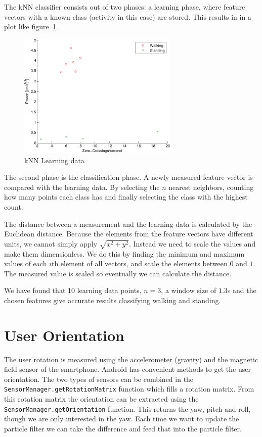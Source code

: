 \documentclass[journal]{IEEEtran}
\let\MYoriglatexcaption\caption
\renewcommand{\caption}[2][\relax]{\MYoriglatexcaption[#2]{#2}}
\begin{document}
The kNN classifier consists out of two phases: a learning phase, where feature
vectors with a known class (activity in this case) are stored. This results in
in a plot like figure~\ref{fig:knn-data}.
%
\begin{figure}[htpb]
 \centering
  \includegraphics[width=3in]{images/knn-data.pdf}
  \caption{kNN Learning data}
  \label{fig:knn-data}
\end{figure}
%
The second phase is the classification phase. A newly measured feature vector
is compared with the learning data. By selecting the $n$ nearest neighbors,
counting how many points each class has and finally selecting the class with
the highest count.

The distance between a measurement and the learning data is calculated by the
Euclidean distance. Because the elements from the feature vectors have
different units, we cannot simply apply $\sqrt{ x^2+y^2 }$. Instead we need to
scale the values and make them dimensionless. We do this by finding the minimum
and maximum values of each $i$th element of all vectors, and scale the elements
between $0$ and $1$. The measured value is scaled so eventually we can
calculate the distance.

We have found that 10 learning data points, $n=3$, a window size of $1.3$s
and the chosen features give accurate results classifying walking and standing.

\section{User Orientation}
The user rotation is measured using the accelerometer (gravity) and the
magnetic field sensor of the smartphone. Android has convenient methods to get
the user orientation. The two types of sensors can be combined in the
\texttt{SensorManager.getRotationMatrix} function which fills a rotation
matrix. From this rotation matrix the orientation can be extracted using the
\texttt{SensorManager.getOrientation} function. This returns the yaw, pitch
and roll, though we are only interested in the yaw. Each time we want to update
the particle filter we can take the difference and feed that into the particle
filter.
\end{document}
